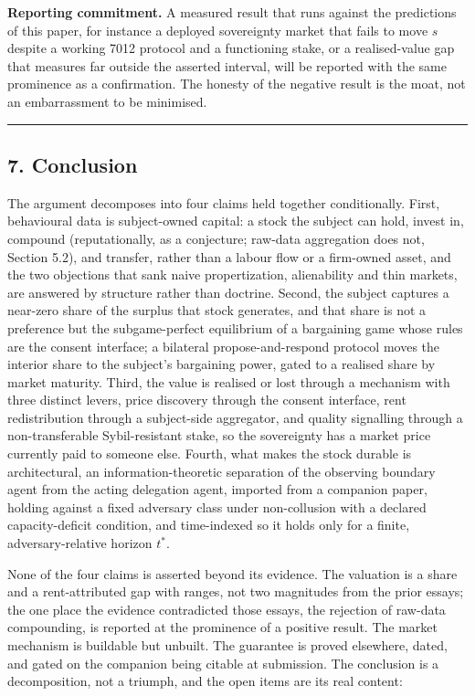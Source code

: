 \documentclass[
  11pt,
]{article}
\begin{document}
\textbf{Reporting commitment.} A measured result that runs against the
predictions of this paper, for instance a deployed sovereignty market
that fails to move \(s\) despite a working 7012 protocol and a
functioning stake, or a realised-value gap that measures far outside the
asserted interval, will be reported with the same prominence as a
confirmation. The honesty of the negative result is the moat, not an
embarrassment to be minimised.

\begin{center}\rule{0.5\linewidth}{0.5pt}\end{center}

\subsection{7. Conclusion}\label{conclusion}

The argument decomposes into four claims held together conditionally.
First, behavioural data is subject-owned capital: a stock the subject
can hold, invest in, compound (reputationally, as a conjecture; raw-data
aggregation does not, Section 5.2), and transfer, rather than a labour
flow or a firm-owned asset, and the two objections that sank naive
propertization, alienability and thin markets, are answered by structure
rather than doctrine. Second, the subject captures a near-zero share of
the surplus that stock generates, and that share is not a preference but
the subgame-perfect equilibrium of a bargaining game whose rules are the
consent interface; a bilateral propose-and-respond protocol moves the
interior share to the subject's bargaining power, gated to a realised
share by market maturity. Third, the value is realised or lost through a
mechanism with three distinct levers, price discovery through the
consent interface, rent redistribution through a subject-side
aggregator, and quality signalling through a non-transferable
Sybil-resistant stake, so the sovereignty has a market price currently
paid to someone else. Fourth, what makes the stock durable is
architectural, an information-theoretic separation of the observing
boundary agent from the acting delegation agent, imported from a
companion paper, holding against a fixed adversary class under
non-collusion with a declared capacity-deficit condition, and
time-indexed so it holds only for a finite, adversary-relative horizon
\(t^{*}\).

None of the four claims is asserted beyond its evidence. The valuation
is a share and a rent-attributed gap with ranges, not two magnitudes
from the prior essays; the one place the evidence contradicted those
essays, the rejection of raw-data compounding, is reported at the
prominence of a positive result. The market mechanism is buildable but
unbuilt. The guarantee is proved elsewhere, dated, and gated on the
companion being citable at submission. The conclusion is a
decomposition, not a triumph, and the open items are its real content:
\end{document}
